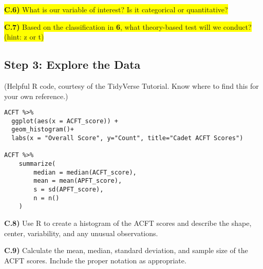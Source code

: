 \documentclass{article}
\newif\ifPrintSolution
\newcommand{\sol}[1]{\ifPrintSolution {\color{blue} #1 } \fi}
\begin{document}
\colorbox{yellow}{\textbf{C.6)} What is our variable of interest? Is it categorical or quantitative?}

\sol{Our variable of interest is ACFT$\_$score, which is a quantitative variable.}

\vspace{0.25in}

\colorbox{yellow}{\textbf{C.7)} Based on the classification in \textbf{6}, what theory-based test will we conduct? (hint: z or t)}

\sol{A quantitative variable will conduct a single-mean test with the \textit{t} statistic.}

\subsection*{Step 3: Explore the Data}

(Helpful R code, courtesy of the TidyVerse Tutorial. Know where to find this for your own reference.) \color{blue}

\begin{verbatim}
ACFT %>% 
  ggplot(aes(x = ACFT_score)) +
  geom_histogram()+
  labs(x = "Overall Score", y="Count", title="Cadet ACFT Scores")

ACFT %>% 
    summarize(
        median = median(ACFT_score),
        mean = mean(APFT_score),
        s = sd(APFT_score),
        n = n()
    )
    \end{verbatim}
\color{black}

\textbf{C.8)} Use R to create a histogram of the ACFT scores and describe the shape, center, variability, and any unusual observations.

\sol{The shape is left skewed with a peak at about 500, centered between 450 and 500. Values range from nearly 600 down to 250 with no obvious outliers.}

\vspace{0.35in}

\textbf{C.9)} Calculate the mean, median, standard deviation, and sample size of the ACFT scores. Include the proper notation as appropriate.

\sol{From the code above, we find that 
mean = $\mu$ = 487\\
median = 505 \\
standard deviation = \textit{s} = 64.7\\
sample size = \textit{n} = 293}

\vspace{0.25 in}
\end{document}
